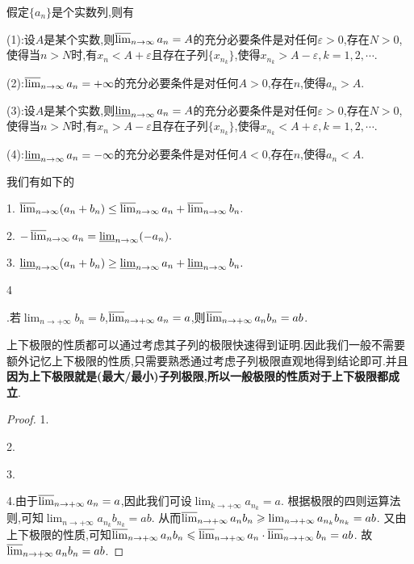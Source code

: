 \documentclass[../../main.tex]{subfiles}
\begin{document}
\begin{proposition}[上下极限的等价定义]\label{proposition:上下极限的等价定义}
假定\(\{a_n\}\)是个实数列,则有

(1):设\(A\)是某个实数,则\(\varlimsup_{n \to \infty} a_n = A\)的充分必要条件是对任何\(\varepsilon > 0\),存在$N>0$,使得当$n>N$时,有$x_n<A+\varepsilon$且存在子列$\{x_{n_k}\}$,使得$x_{n_k}>A-\varepsilon,k=1,2,\cdots$.

(2):\(\varlimsup_{n \to \infty} a_n = +\infty\)的充分必要条件是对任何\(A > 0\),存在\(n\),使得\(a_n > A\).

(3):设\(A\)是某个实数,则\(\varliminf_{n \to \infty} a_n = A\)的充分必要条件是对任何\(\varepsilon > 0\),存在$N>0$,使得当$n>N$时,有$x_n>A-\varepsilon$且存在子列$\{x_{n_k}\}$,使得$x_{n_k}<A+\varepsilon,k=1,2,\cdots$.

(4):\(\varliminf_{n \to \infty} a_n = -\infty\)的充分必要条件是对任何\(A < 0\),存在\(n\),使得\(a_n < A\).
\end{proposition}

\begin{proposition}[上下极限的性质]\label{proposition:上下极限的性质}
我们有如下的

1. $\varlimsup_{n \to \infty} (a_n + b_n) \leq \varlimsup_{n \to \infty} a_n + \varlimsup_{n \to \infty} b_n.$

2. $-\varlimsup_{n \to \infty} a_n = \varliminf_{n \to \infty} (-a_n).$

3. $\varliminf_{n \to \infty} (a_n + b_n) \geq \varliminf_{n \to \infty} a_n + \varliminf_{n \to \infty} b_n.$

\hypertarget{上极限的性质命题(4)}{4}.若\(\lim_{n \to +\infty} b_n = b\),\(\varlimsup_{n \to +\infty} a_n = a\),则\(\varlimsup_{n \to +\infty} a_n b_n = ab\).
\end{proposition}
\begin{note}
上下极限的性质都可以通过考虑其子列的极限快速得到证明.因此我们一般不需要额外记忆上下极限的性质,只需要熟悉通过考虑子列极限直观地得到结论即可.并且\textbf{因为上下极限就是(最大/最小)子列极限,所以一般极限的性质对于上下极限都成立}.
\end{note}
\begin{proof}
1.

2.

3.

4.由于\(\varlimsup_{n \to +\infty} a_n = a\),因此我们可设\(\lim_{k \to +\infty} a_{n_k} = a\).
根据极限的四则运算法则,可知\(\lim_{n \to +\infty} a_{n_k} b_{n_k} = ab\).
从而\(\varlimsup_{n \to +\infty} a_n b_n \geqslant \lim_{n \to +\infty} a_{n_k} b_{n_k} = ab\).
又由上下极限的性质,可知\(\varlimsup_{n \to +\infty} a_n b_n \leqslant \varlimsup_{n \to +\infty} a_n \cdot \varlimsup_{n \to +\infty} b_n = ab\).
故\(\varlimsup_{n \to +\infty} a_n b_n = ab\).
\end{proof}
\end{document}
